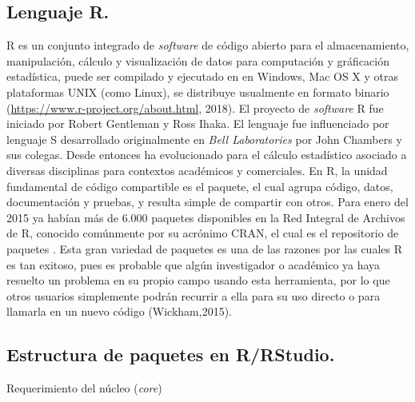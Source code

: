 \subsection{Lenguaje R.}

R es un conjunto  integrado de \textit{software} de código abierto para el almacenamiento, manipulación, cálculo y visualización de datos para computación y gráficación estadística, puede ser compilado y ejecutado en  en Windows, Mac OS X y otras  plataformas UNIX (como Linux), se distribuye usualmente en formato binario (\url{https://www.r-project.org/about.html}, 2018). El proyecto de \emph{software} R fue iniciado por Robert Gentleman y Ross Ihaka. El lenguaje fue influenciado por  lenguaje S desarrollado originalmente en \textit{Bell Laboratories} por John Chambers y sus colegas. Desde entonces ha evolucionado  para el cálculo estadístico asociado a diversas disciplinas para contextos académicos y comerciales. En R, la unidad fundamental de código compartible es el paquete, el cual agrupa código, datos, documentación y pruebas, y resulta simple de compartir con otros. Para enero del 2015 ya habían más de 6.000 paquetes disponibles en la Red Integral de Archivos de R, conocido comúnmente por su acrónimo CRAN, el cual es el repositorio de paquetes . Esta gran variedad de paquetes es una de las razones por las cuales R es tan exitoso, pues es probable que algún investigador o académico ya haya resuelto un problema en su propio campo usando esta herramienta, por lo que otros usuarios simplemente podrán recurrir a ella para su uso directo o para llamarla en un nuevo código (Wickham,2015). \\

\subsection{Estructura de paquetes en R/RStudio.}

Requerimiento del núcleo (\textit{core})

